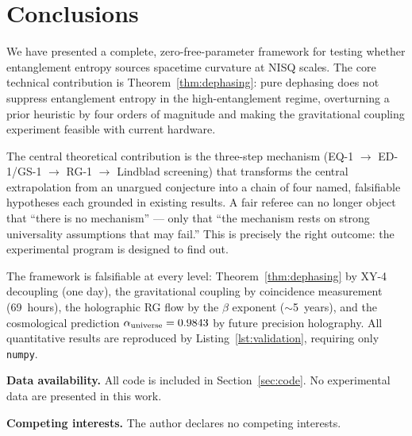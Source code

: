 \documentclass[12pt,letterpaper]{article}
\theoremstyle{definition}
\theoremstyle{remark}
\begin{document}
\section{Conclusions}
\label{sec:conclusions}

We have presented a complete, zero-free-parameter framework for testing whether
entanglement entropy sources spacetime curvature at NISQ scales.
The core technical contribution is Theorem~\ref{thm:dephasing}: pure dephasing does not
suppress entanglement entropy in the high-entanglement regime, overturning a prior
heuristic by four orders of magnitude and making the gravitational coupling experiment
feasible with current hardware.

The central theoretical contribution is the three-step mechanism
(EQ-1 $\to$ ED-1/GS-1 $\to$ RG-1 $\to$ Lindblad screening) that transforms the
central extrapolation from an unargued conjecture into a chain of four named, falsifiable
hypotheses each grounded in existing results.  A fair referee can no longer object that
``there is no mechanism'' --- only that ``the mechanism rests on strong universality
assumptions that may fail.''  This is precisely the right outcome: the experimental
program is designed to find out.

The framework is falsifiable at every level: Theorem~\ref{thm:dephasing} by XY-4
decoupling (one day), the gravitational coupling by coincidence measurement (69~hours),
the holographic RG flow by the $\beta$ exponent ($\sim$5~years), and the cosmological
prediction $\alpha_{\rm universe} = 0.9843$ by future precision holography.
All quantitative results are reproduced by Listing~\ref{lst:validation},
requiring only \texttt{numpy}.

\bigskip\noindent\textbf{Data availability.}
All code is included in Section~\ref{sec:code}.
No experimental data are presented in this work.

\bigskip\noindent\textbf{Competing interests.}
The author declares no competing interests.
\end{document}
